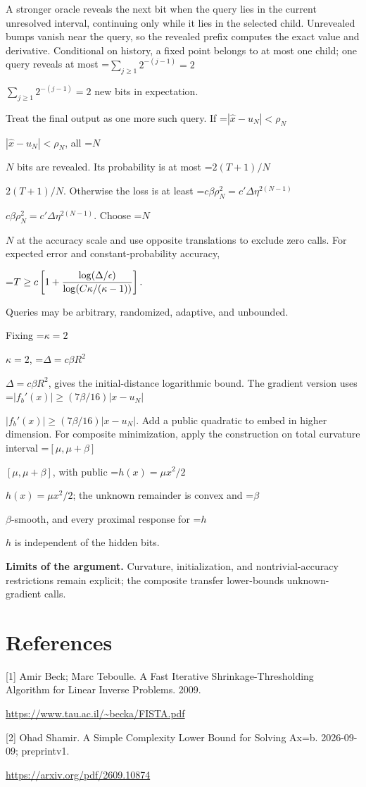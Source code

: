 \documentclass[10pt,a4paper]{article}
\newcommand{\AtlasMath}[1]{\par\begingroup\centering\setbox0=\hbox{$\displaystyle #1$}\ifdim\wd0>1.4\linewidth\typeout{ATLAS WIDE FORMULA: \the\wd0}\fi\ifdim\wd0>\linewidth\resizebox{\linewidth}{!}{\box0}\else\box0\fi\par\endgroup}
\newcommand{\AtlasInlineMath}[1]{\begingroup\setbox0=\hbox{$#1$}\ifdim\wd0>.4\linewidth\endgroup\AtlasMath{#1}\else\endgroup$#1$\fi}
\begin{document}
A stronger oracle reveals the next bit when the query lies in the current unresolved interval, continuing only while it lies in the selected child. Unrevealed bumps vanish near the query, so the revealed prefix computes the exact value and derivative. Conditional on history, a fixed point belongs to at most one child; one query reveals at most \AtlasInlineMath{\sum_{j\ge1}2^{-(j-1)}=2} new bits in expectation.

Treat the final output as one more such query. If \AtlasInlineMath{|\widehat x-u_N|<\rho_N}, all \AtlasInlineMath{N} bits are revealed. Its probability is at most \AtlasInlineMath{2(T+1)/N}. Otherwise the loss is at least
\AtlasInlineMath{c\beta\rho_N^2=c'\Delta\eta^{2(N-1)}}.
Choose \AtlasInlineMath{N} at the accuracy scale and use opposite translations to exclude zero calls. For expected error and constant-probability accuracy,

\AtlasMath{T\ge c\left[1+{\log(\Delta/\epsilon)\over
\log(C\kappa/(\kappa-1))}\right].}

Queries may be arbitrary, randomized, adaptive, and unbounded.

Fixing \AtlasInlineMath{\kappa=2}, \AtlasInlineMath{\Delta=c\beta R^2}, gives the initial-distance logarithmic bound. The gradient version uses
\AtlasInlineMath{|f_b'(x)|\ge(7\beta/16)|x-u_N|}.
Add a public quadratic to embed in higher dimension. For composite minimization, apply the construction on total curvature interval \AtlasInlineMath{[\mu,\mu+\beta]}, with public \AtlasInlineMath{h(x)=\mu x^2/2}; the unknown remainder is convex and \AtlasInlineMath{\beta}-smooth, and every proximal response for \AtlasInlineMath{h} is independent of the hidden bits.

\textbf{Limits of the argument.} Curvature, initialization, and nontrivial-accuracy restrictions remain explicit; the composite transfer lower-bounds unknown-gradient calls.

\section{References}
[1] Amir Beck; Marc Teboulle. A Fast Iterative Shrinkage-Thresholding Algorithm for Linear Inverse Problems. 2009.

\url{https://www.tau.ac.il/~becka/FISTA.pdf}

[2] Ohad Shamir. A Simple Complexity Lower Bound for Solving Ax=b. 2026-09-09; preprintv1.

\url{https://arxiv.org/pdf/2609.10874}
\end{document}
